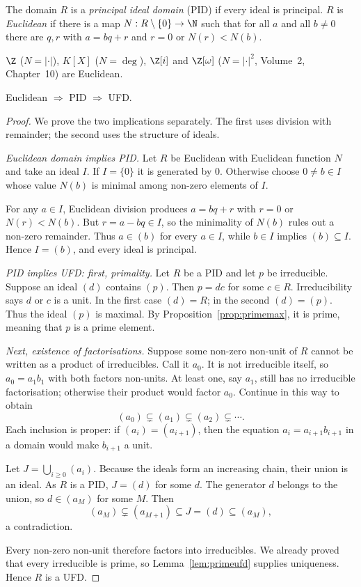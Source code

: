 \begin{definition}
The domain $R$ is a \emph{principal ideal domain} (PID) if every ideal is principal. $R$ is \emph{Euclidean} if there is a map $N:R\setminus\{0\}\to\N$ such that for all $a$ and all $b\ne0$ there are $q,r$ with $a=bq+r$ and $r=0$ or $N(r)<N(b)$.
\end{definition}

$\Z$ ($N=|\cdot|$), $K[X]$ ($N=\deg$), $\Z[i]$ and $\Z[\omega]$ ($N=|\cdot|^2$, Volume~2, Chapter~10) are Euclidean.

\begin{theorem}\label{thm:edpidufd}
Euclidean $\Rightarrow$ PID $\Rightarrow$ UFD.
\end{theorem}
\begin{proof}
We prove the two implications separately.
The first uses division with remainder;
the second uses the structure of ideals.

\emph{Euclidean domain implies PID.}
Let $R$ be Euclidean with Euclidean
function $N$ and take an ideal $I$.
If $I=\{0\}$ it is generated by $0$.
Otherwise choose $0\ne b\in I$
whose value $N(b)$ is minimal among
non-zero elements of $I$.

For any $a\in I$, Euclidean division
produces $a=bq+r$ with $r=0$ or
$N(r)<N(b)$. But $r=a-bq\in I$,
so the minimality of $N(b)$ rules
out a non-zero remainder.
Thus $a\in(b)$ for every $a\in I$,
while $b\in I$ implies $(b)\subseteq I$.
Hence $I=(b)$, and every ideal is principal.

\emph{PID implies UFD: first, primality.}
Let $R$ be a PID and let $p$ be irreducible.
Suppose an ideal $(d)$ contains $(p)$.
Then $p=dc$ for some $c\in R$.
Irreducibility says $d$ or $c$ is a
unit. In the first case $(d)=R$;
in the second $(d)=(p)$.
Thus the ideal $(p)$ is maximal.
By Proposition~\ref{prop:primemax},
it is prime, meaning that $p$
is a prime element.

\emph{Next, existence of factorisations.}
Suppose some non-zero non-unit of $R$
cannot be written as a product of
irreducibles. Call it $a_0$.
It is not irreducible itself, so
$a_0=a_1b_1$ with both factors non-units.
At least one, say $a_1$, still has no
irreducible factorisation; otherwise
their product would factor $a_0$.
Continue in this way to obtain
\[
(a_0)\subsetneq(a_1)
\subsetneq(a_2)\subsetneq\cdots.
\]
Each inclusion is proper: if
$(a_i)=(a_{i+1})$, then the equation
$a_i=a_{i+1}b_{i+1}$ in a domain
would make $b_{i+1}$ a unit.

Let $J=\bigcup_{i\ge0}(a_i)$.
Because the ideals form an increasing
chain, their union is an ideal.
As $R$ is a PID, $J=(d)$ for some $d$.
The generator $d$ belongs to the union,
so $d\in(a_M)$ for some $M$.
Then
\[
(a_M)\subsetneq(a_{M+1})
\subseteq J=(d)\subseteq(a_M),
\]
a contradiction.

Every non-zero non-unit therefore factors
into irreducibles. We already proved
that every irreducible is prime, so
Lemma~\ref{lem:primeufd} supplies
uniqueness. Hence $R$ is a UFD.
\end{proof}

